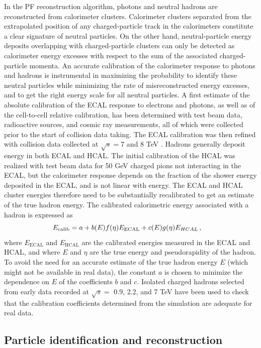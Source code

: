 In the PF reconstruction algorithm, photons and neutral hadrons are reconstructed from calorimeter clusters. Calorimeter clusters separated from the extrapolated position of any charged-particle track in the calorimeters constitute a clear signature of neutral particles.  On the other hand, neutral-particle energy deposits overlapping with charged-particle clusters can only be detected  as  calorimeter  energy  excesses  with  respect  to  the  sum  of  the  associated  charged-particle momenta. An accurate calibration of the calorimeter response to photons and hadrons is instrumental in maximizing the probability to identify these neutral particles while minimizing the rate of misreconstructed energy excesses, and to get the right energy scale for all neutral particles. A first estimate of the absolute calibration of the ECAL response to electrons and photons, as well as of the cell-to-cell relative calibration, has been determined with test beam data, radioactive sources,  and cosmic ray measurements,  all of which were collected prior to the start of collision data taking.  The ECAL calibration was then refined with collision data collected at $\sqrt{s}=$7 and 8 TeV \cite{2013}. Hadrons generally deposit energy in both ECAL and HCAL. The initial calibration of the HCAL was realized with test beam data for 50 GeV charged pions not interacting in the ECAL, but the calorimeter response depends on the fraction of the shower energy deposited in the ECAL, and is not linear with energy. The ECAL and HCAL cluster energies therefore need to be substantially recalibrated to get an estimate of the true hadron energy. The calibrated calorimetric energy associated with a hadron is expressed as
\begin{equation}
    E_{\mathrm{calib}} = a + b(E)f(\eta)E_{\mathrm{ECAL}} + c(E)g(\eta)E_{HCAL} \msep
\end{equation}
where $E_{\mathrm{ECAL}}$ and $E_{\mathrm{HCAL}}$ are the calibrated energies measured in the ECAL and HCAL, and where $E$ and $\eta$ are the true energy and pseudorapidity of the hadron. To avoid the need for an accurate estimate of the true hadron energy $E$ (which might not be available in real data),  the constant $a$ is chosen to minimize the dependence on $E$ of the coefficients $b$ and $c$. Isolated charged hadrons selected from early data recorded at $\sqrt{s}=$ 0.9, 2.2, and 7 TeV have been used to check that the calibration coefficients determined from the simulation are adequate for real data.

\subsection{Particle identification and reconstruction}

